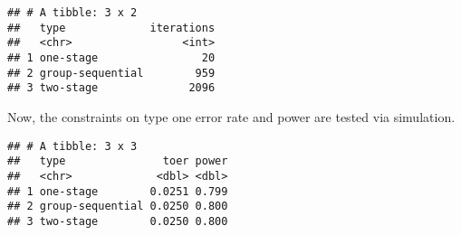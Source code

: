 \documentclass[
]{book}
\newenvironment{Shaded}{\begin{snugshade}}{\end{snugshade}}
\newcommand{\DataTypeTok}[1]{\textcolor[rgb]{0.13,0.29,0.53}{#1}}
\newcommand{\DecValTok}[1]{\textcolor[rgb]{0.00,0.00,0.81}{#1}}
\newcommand{\FloatTok}[1]{\textcolor[rgb]{0.00,0.00,0.81}{#1}}
\newcommand{\KeywordTok}[1]{\textcolor[rgb]{0.13,0.29,0.53}{\textbf{#1}}}
\newcommand{\NormalTok}[1]{#1}
\newcommand{\OperatorTok}[1]{\textcolor[rgb]{0.81,0.36,0.00}{\textbf{#1}}}
\newcommand{\StringTok}[1]{\textcolor[rgb]{0.31,0.60,0.02}{#1}}
\begin{document}
\begin{verbatim}
## # A tibble: 3 x 2
##   type             iterations
##   <chr>                 <int>
## 1 one-stage                20
## 2 group-sequential        959
## 3 two-stage              2096
\end{verbatim}

Now, the constraints on type one error rate and power are tested via simulation.

\begin{Shaded}
\end{Shaded}

\begin{verbatim}
## # A tibble: 3 x 3
##   type               toer power
##   <chr>             <dbl> <dbl>
## 1 one-stage        0.0251 0.799
## 2 group-sequential 0.0250 0.800
## 3 two-stage        0.0250 0.800
\end{verbatim}
\end{document}
